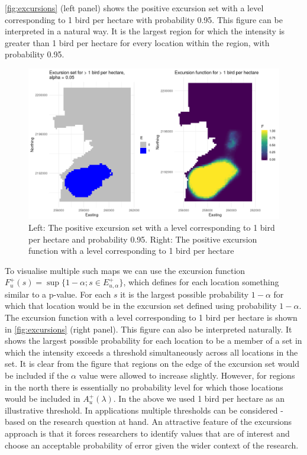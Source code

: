 \documentclass[preprint,12pt]{elsarticle}
\begin{document}
\autoref{fig:excursions} (left panel) shows the positive excursion set with a level corresponding to 1 bird per hectare with probability 0.95.  This figure can be interpreted in a natural way.  It is the largest region for which the intensity is greater than 1 bird per hectare for every location within the region, with probability 0.95.
\begin{figure}
	\includegraphics[scale=0.5]{figures/excursions.png}
	\caption{Left:  The positive excursion set with a level corresponding to 1 bird per hectare and probability 0.95.  Right: The positive excursion function with a level corresponding to 1 bird per hectare}
	\label{fig:excursions}
\end{figure}
To visualise multiple such maps we can use the excursion function $F_u^{+}(s) = \sup \{1 - \alpha ; s \in E_{u,\alpha}^+ \}$, which defines for each location something similar to a p-value.  For each $s$ it is the largest possible probability $1 -\alpha$ for which that location would be in the excursion set defined using probability $1 - \alpha$.  The excursion function with a level corresponding to 1 bird per hectare is shown in \autoref{fig:excursions} (right panel).  This figure can also be interpreted naturally.  It shows the largest possible probability for each location to be a member of a set in which the intensity exceeds a threshold simultaneously across all locations in the set. It is clear from the figure that regions on the edge of the excursion set would be included if the $\alpha$ value were allowed to increase slightly.  However, for regions in the north there is essentially no probability level for which those locations would be included in $A_u^{+}(\lambda)$.  In the above we used 1 bird per hectare as an illustrative threshold.  In applications multiple thresholds can be considered - based on the research question at hand.  An attractive feature of the excursions approach is that it forces researchers to identify values that are of interest and choose an acceptable probability of error given the wider context of the research.  
\end{document}
